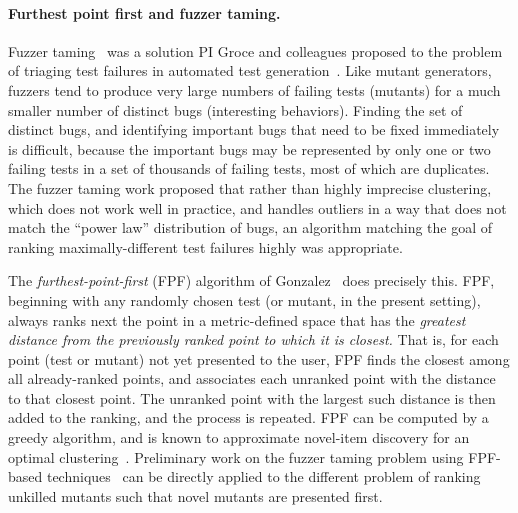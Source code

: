 \paragraph{Furthest point first and fuzzer taming.} Fuzzer taming~\cite{PLDI13}
was a solution PI Groce and colleagues proposed to the problem
of triaging test failures in automated test generation~\cite{SemCrash}.
Like mutant generators, fuzzers tend to produce very large numbers of failing
tests (mutants) for a much
smaller number of distinct bugs (interesting behaviors).  Finding the set of distinct bugs,
and identifying important bugs that need to be fixed immediately is
difficult, because the important bugs may be represented by only one
or two failing tests in a set of thousands of failing tests, most of
which are duplicates.  The fuzzer taming work proposed that rather than highly imprecise
clustering, which does not work well in practice, and handles outliers
in a way that does not match the ``power law'' distribution of bugs, an
algorithm matching the goal of ranking maximally-different test
failures highly was appropriate.

The \emph{furthest-point-first} (FPF) algorithm of
Gonzalez~\cite{Gonzalez85} does precisely this.  FPF, beginning with
any randomly chosen test (or mutant, in the present setting), always ranks
next the point in a metric-defined space that has the \emph{greatest
  distance from the previously ranked point to which it is closest.}
That is, for each point (test or mutant) not yet presented to the
user, FPF finds the closest among all already-ranked points, and
associates each unranked point with the distance to that closest
point.  The unranked point with the largest such distance is then
added to the ranking, and the process is repeated.  FPF can be
computed by a greedy algorithm, and is known to approximate novel-item
discovery for an optimal clustering~\cite{Gonzalez85}.  Preliminary work on the fuzzer taming problem using FPF-based
techniques~\cite{PLDI13,distMut} can be directly applied
to the different problem of ranking
unkilled mutants such that novel mutants are presented first.  %

